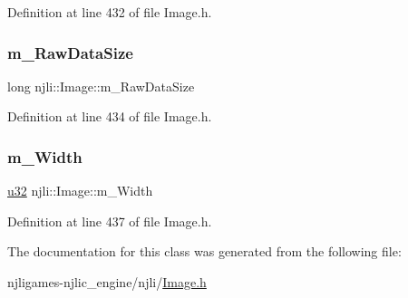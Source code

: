 Definition at line 432 of file Image.\+h.

\mbox{\label{classnjli_1_1_image_af97facbdedc7d4ad1e9831cc7b3d6300}} 
\subsubsection{\texorpdfstring{m\+\_\+\+Raw\+Data\+Size}{m\_RawDataSize}}
{\footnotesize\ttfamily long njli\+::\+Image\+::m\+\_\+\+Raw\+Data\+Size\hspace{0.3cm}{\ttfamily [private]}}



Definition at line 434 of file Image.\+h.

\mbox{\label{classnjli_1_1_image_a784a866596cacd15f4ddb59a0b56f78c}} 
\subsubsection{\texorpdfstring{m\+\_\+\+Width}{m\_Width}}
{\footnotesize\ttfamily \mbox{\hyperlink{_util_8h_a10e94b422ef0c20dcdec20d31a1f5049}{u32}} njli\+::\+Image\+::m\+\_\+\+Width\hspace{0.3cm}{\ttfamily [private]}}



Definition at line 437 of file Image.\+h.



The documentation for this class was generated from the following file\+:\begin{DoxyCompactItemize}
\item 
njligames-\/njlic\+\_\+engine/njli/\mbox{\hyperlink{_image_8h}{Image.\+h}}\end{DoxyCompactItemize}
